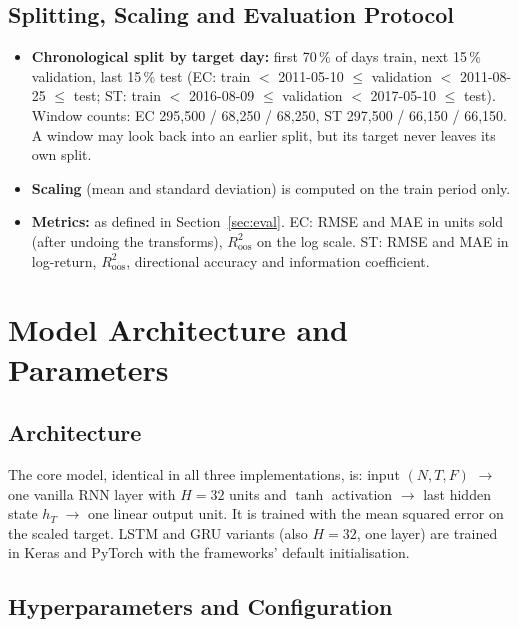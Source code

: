 \documentclass[11pt, a4paper]{article}
\begin{document}
\subsection{Splitting, Scaling and Evaluation Protocol}

\begin{itemize}
\item \textbf{Chronological split by target day:} first 70\,\% of days train, next 15\,\% validation, last 15\,\% test (EC: train $<$ 2011-05-10 $\le$ validation $<$
  2011-08-25 $\le$ test; ST: train $<$ 2016-08-09 $\le$ validation $<$ 2017-05-10 $\le$ test). Window counts: EC 295{,}500 / 68{,}250 / 68{,}250, ST 297{,}500 / 66{,}150 / 66{,}150.
  A window may look back into an earlier split, but its target never leaves its own split.
\item \textbf{Scaling} (mean and standard deviation) is computed on the train period only.
\item \textbf{Metrics:} as defined in Section~\ref{sec:eval}. EC: RMSE and MAE in units sold (after undoing the transforms), $R^2_{\text{oos}}$ on the log scale. ST: RMSE and MAE in log-return, $R^2_{\text{oos}}$, directional accuracy and information coefficient.
\end{itemize}

\section{Model Architecture and Parameters}

\subsection{Architecture}

The core model, identical in all three implementations, is: input $(N,T,F)$ $\to$ one vanilla RNN layer with $H=32$ units and $\tanh$ activation $\to$ last hidden state $h_T$ $\to$ one linear output unit.
It is trained with the mean squared error on the scaled target. LSTM and GRU variants (also $H=32$, one layer) are trained in Keras and PyTorch with the frameworks' default initialisation.

\subsection{Hyperparameters and Configuration}
\end{document}
